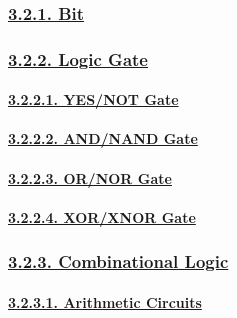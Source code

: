 \documentclass[
]{article}
\begin{document}
\hypertarget{bit}{%
\subsubsection{\texorpdfstring{\protect\hyperlink{bit-1}{3.2.1.
Bit}}{3.2.1. Bit}}\label{bit}}

\hypertarget{logic-gate}{%
\subsubsection{\texorpdfstring{\protect\hyperlink{logic-gate-1}{3.2.2.
Logic Gate}}{3.2.2. Logic Gate}}\label{logic-gate}}

\hypertarget{yesnot-gate}{%
\paragraph{\texorpdfstring{\protect\hyperlink{yesnot-gate-1}{3.2.2.1.
YES/NOT Gate}}{3.2.2.1. YES/NOT Gate}}\label{yesnot-gate}}

\hypertarget{andnand-gate}{%
\paragraph{\texorpdfstring{\protect\hyperlink{andnand-gate-1}{3.2.2.2.
AND/NAND Gate}}{3.2.2.2. AND/NAND Gate}}\label{andnand-gate}}

\hypertarget{ornor-gate}{%
\paragraph{\texorpdfstring{\protect\hyperlink{ornor-gate-1}{3.2.2.3.
OR/NOR Gate}}{3.2.2.3. OR/NOR Gate}}\label{ornor-gate}}

\hypertarget{xorxnor-gate}{%
\paragraph{\texorpdfstring{\protect\hyperlink{xorxnor-gate-1}{3.2.2.4.
XOR/XNOR Gate}}{3.2.2.4. XOR/XNOR Gate}}\label{xorxnor-gate}}

\hypertarget{combinational-logic}{%
\subsubsection{\texorpdfstring{\protect\hyperlink{combinational-logic-1}{3.2.3.
Combinational
Logic}}{3.2.3. Combinational Logic}}\label{combinational-logic}}

\hypertarget{arithmetic-circuits}{%
\paragraph{\texorpdfstring{\protect\hyperlink{arithmetic-circuits-1}{3.2.3.1.
Arithmetic
Circuits}}{3.2.3.1. Arithmetic Circuits}}\label{arithmetic-circuits}}
\end{document}

